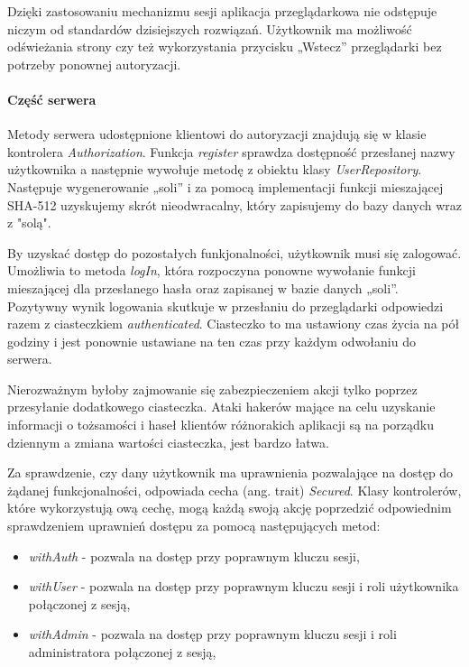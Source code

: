 \documentclass[a4paper,12pt,twoside]{article}
\begin{document}
Dzięki zastosowaniu mechanizmu sesji aplikacja przeglądarkowa nie odstępuje niczym
od standardów dzisiejszych rozwiązań.
Użytkownik ma możliwość odświeżania strony czy też wykorzystania przycisku „Wstecz” przeglądarki bez potrzeby ponownej autoryzacji.

\paragraph{Część serwera}
Metody serwera udostępnione klientowi do autoryzacji
znajdują się w klasie kontrolera \textit{Authorization}.
Funkcja \textit{register}
sprawdza dostępność przesłanej nazwy użytkownika a następnie wywołuje
metodę z obiektu klasy \textit{UserRepository}.
Następuje wygenerowanie „soli” i za pomocą implementacji funkcji mieszającej
SHA-512 uzyskujemy skrót nieodwracalny, który zapisujemy do bazy danych wraz z "solą".

By uzyskać dostęp do pozostałych funkjonalności, użytkownik musi się zalogować.
Umożliwia to metoda \textit{logIn}, która rozpoczyna ponowne wywołanie
funkcji mieszającej dla przesłanego hasła oraz zapisanej w bazie danych „soli”. Pozytywny wynik logowania skutkuje w przesłaniu do przeglądarki
odpowiedzi razem z ciasteczkiem \textit{authenticated}.
Ciasteczko to ma ustawiony czas życia na pół godziny i jest ponownie
ustawiane na ten czas przy każdym odwołaniu do serwera.

Nierozważnym byłoby zajmowanie się zabezpieczeniem akcji
tylko poprzez przesyłanie dodatkowego ciasteczka.
Ataki hakerów mające na celu uzyskanie informacji o tożsamości i haseł
klientów różnorakich aplikacji są na porządku dziennym a zmiana
wartości ciasteczka, jest bardzo łatwa.

\newpage
Za sprawdzenie, czy dany użytkownik ma uprawnienia pozwalające
na dostęp do żądanej funkcjonalności, odpowiada
cecha (ang. trait) \textit{Secured}.
Klasy kontrolerów, które wykorzystują ową cechę, mogą każdą
swoją akcję poprzedzić odpowiednim sprawdzeniem uprawnień dostępu
za pomocą następujących metod:
\begin{itemize}
\item \textit{withAuth} - pozwala na dostęp przy poprawnym kluczu sesji,
\item \textit{withUser} - pozwala na dostęp przy poprawnym kluczu sesji i roli użytkownika połączonej z sesją,
\item \textit{withAdmin} - pozwala na dostęp przy poprawnym kluczu sesji i roli administratora połączonej z sesją,
\end{itemize}
\end{document}
